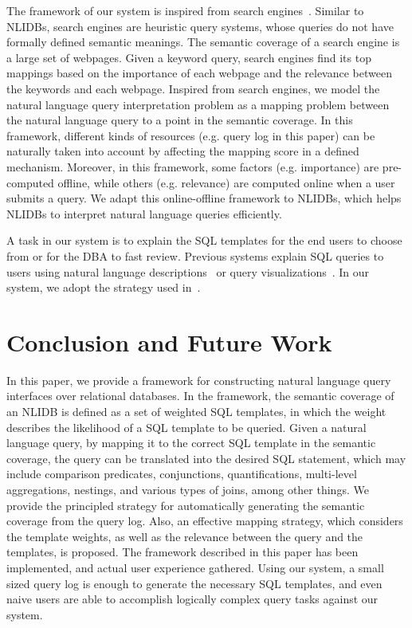 \documentclass{vldb}
\begin{document}
The framework of our system is inspired from search engines~\cite{DBLP:journals/cn/BrinP98, Page99thepagerank}. Similar to NLIDBs, search engines are heuristic query systems, whose queries do not have formally defined semantic meanings. The semantic coverage of a search engine is a large set of webpages. Given a keyword query, search engines find its top mappings based on the importance of each webpage and the relevance between the keywords and each webpage.  Inspired from search engines, we model the natural language query interpretation problem as a mapping problem between the natural language query to a point in the semantic coverage.  In this framework, different kinds of resources (e.g. query log in this paper) can be naturally taken into account by affecting the mapping score in a defined mechanism.  Moreover, in this framework, some factors (e.g. importance) are pre-computed offline, while others (e.g. relevance) are computed online when a user submits a query.  We adapt this online-offline framework to NLIDBs, which helps NLIDBs to interpret natural language queries efficiently.  

A task in our system is to explain the SQL templates for the end users to choose from or for the DBA to fast review.  Previous systems explain SQL queries to users using natural language descriptions~\cite{DBLP:conf/sigmod/KokkalisVZSKI12} or query visualizations~\cite{DBLP:conf/edbt/DanaparamitaG11,DBLP:conf/icde/FanLZ11,DBLP:journals/pvldb/BergamaschiGILV13}.  In our system, we adopt the strategy used in~\cite{DBLP:conf/sigmod/KokkalisVZSKI12}.  

\section{Conclusion and Future Work}
\label{sec:conclusion}

In this paper, we provide a framework for constructing natural language query interfaces over relational databases.  In the framework, the semantic coverage of an NLIDB is defined as a set of weighted SQL templates, in which the weight describes the likelihood of a SQL template to be queried.  Given a natural language query, by mapping it to the correct SQL template in the semantic coverage, the query can be translated into the desired SQL statement, which may include comparison predicates, conjunctions, quantifications, multi-level aggregations, nestings, and various types of joins, among other things.  We provide the principled strategy for automatically generating the semantic coverage from the query log.  Also, an effective mapping strategy, which considers the template weights, as well as the relevance between the query and the templates, is proposed.  The framework described in this paper has been implemented, and actual user experience gathered.  Using our system, a small sized query log is enough to generate the necessary SQL templates, and even naive users are able to accomplish logically complex query tasks against our system.   
\end{document}

